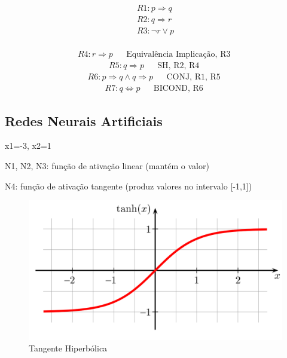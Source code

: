 



\begin{equation*}
    \begin{gathered}
        R1: p \Rightarrow q \\
        R2: q \Rightarrow r \\
        R3: \neg{r} \lor p \\
    \end{gathered}
\end{equation*}


\begin{align*}
    R4: r \Rightarrow p && \text{Equivalência Implicação, R3 }
\end{align*}
\begin{align*}
    R5: q \Rightarrow p && \text{SH, R2, R4 }
\end{align*}
\begin{align*}
    R6: p \Rightarrow q \land q \Rightarrow p && \text{CONJ, R1, R5 }
\end{align*}
\begin{align*}
    R7: q \Leftrightarrow p && \text{BICOND, R6 }
\end{align*}


\subsection{Redes Neurais Artificiais}

x1=-3, x2=1

N1, N2, N3: função de ativação linear (mantém o valor)

N4: função de ativação tangente (produz valores no intervalo [-1,1])

\begin{figure}[!h]
\centering
\includegraphics[width=0.6\linewidth]{apendices/fig/1_IAA001_5.png}
\caption{Tangente Hiperbólica}
\label{tanh}
\end{figure}

